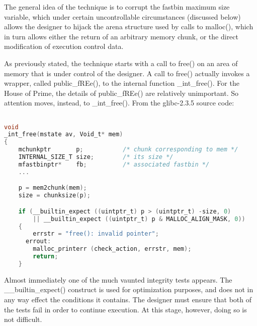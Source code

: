 \documentclass[12pt]{article}
\begin{document}
The general idea of the technique is to corrupt the fastbin maximum
size variable, which under certain uncontrollable circumstances
(discussed below) allows the designer to hijack the arena structure
used by calls to malloc(), which in turn allows either the return
of an arbitrary memory chunk, or the direct modification of
execution control data.
\newline


As previously stated, the technique starts with a call to free() on
an area of memory that is under control of the designer. A call to
free() actually invokes a wrapper, called public\_fREe(), to the
internal function \_int\_free(). For the House of Prime, the details
of public\_fREe() are relatively unimportant. So attention moves,
instead, to \_int\_free(). From the glibc-2.3.5 source code:
\begin{lstlisting}[language=C]

void
_int_free(mstate av, Void_t* mem)
{
    mchunkptr       p;           /* chunk corresponding to mem */
    INTERNAL_SIZE_T size;        /* its size */
    mfastbinptr*    fb;          /* associated fastbin */
    ...

    p = mem2chunk(mem);
    size = chunksize(p);

    if (__builtin_expect ((uintptr_t) p > (uintptr_t) -size, 0)
        || __builtin_expect ((uintptr_t) p & MALLOC_ALIGN_MASK, 0))
    {
        errstr = "free(): invalid pointer";
      errout:
        malloc_printerr (check_action, errstr, mem);
        return;
    }
\end{lstlisting}
Almost immediately one of the much vaunted integrity tests appears.
The \_\_builtin\_expect() construct is used for optimization purposes,
and does not in any way effect the conditions it contains. The
designer must ensure that both of the tests fail in order to
continue execution. At this stage, however, doing so is not
difficult.
\newline
\end{document}
